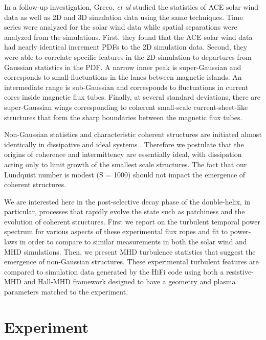 \documentclass[12pt]{iopart}
\begin{document}
In a follow-up investigation, Greco, {\it et al} \cite{Greco09} studied the statistics of ACE solar wind data as well as 2D and 3D simulation data using the same techniques.  Time series were analyzed for the solar wind data while spatial separations were analyzed from the simulations.  First, they found that the ACE solar wind data had nearly identical increment PDFs to the 2D simulation data.  Second, they were able to correlate specific features in the 2D simulation to departures from Gaussian statistics in the PDF.  A narrow inner peak is super-Gaussian and corresponds to small fluctuations in the lanes between magnetic islands.  An intermediate range is sub-Gaussian and corresponds to fluctuations in current cores inside magnetic flux tubes.  Finally, at several standard deviations, there are super-Gaussian wings corresponding to coherent small-scale current-sheet-like structures that form the sharp boundaries between the magnetic flux tubes.

Non-Gaussian statistics and characteristic coherent structures are initiated almost identically in dissipative and ideal systems \cite{Wan09}. Therefore we postulate that the origins of coherence and intermittency are essentially ideal, with dissipation acting only to limit growth of the smallest scale structures.  The fact that our Lundquist number is modest (S = 1000) should not impact the emergence of coherent structures.

We are interested here in the post-selective decay phase of the double-helix, in particular, processes that rapidly evolve the state such as patchiness and the evolution of coherent structures. First we report on the turbulent temporal power spectrum for various aspects of these experimental flux ropes and fit to power-laws in order to compare to similar measurements in both the solar wind and MHD simulations. Then, we present MHD turbulence statistics that suggest the emergence of non-Gaussian structures. These experimental turbulent features are compared to simulation data generated by the HiFi code using both a resistive-MHD and Hall-MHD framework designed to have a geometry and plasma parameters matched to the experiment.

\section{Experiment}
\end{document}

